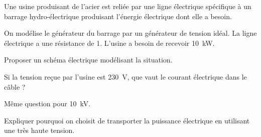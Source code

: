

Une usine produisant de l’acier est reliée par une ligne électrique spécifique à un barrage hydro-électrique produisant l'énergie électrique dont elle a besoin.

On modélise le générateur du barrage par un générateur de tension idéal. La ligne électrique a une résistance de \SI{1}{\Omega}. L'usine a besoin de recevoir \SI{10}{kW}.

\question Proposer un schéma électrique modélisant la situation.

\question Si la tension reçue par l'usine est \SI{230}{V}, que vaut le courant électrique dans le câble ?

\question Même question pour \SI{10}{kV}.

\question Expliquer pourquoi on choisit de transporter la puissance électrique en utilisant une très haute tension.
